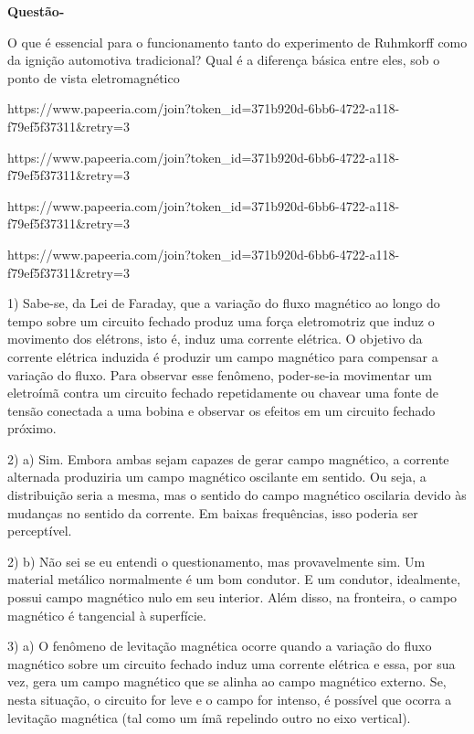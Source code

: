 \documentclass[12pt, a4paper, notitlepage]{article}
\newcounter{counterquestions}
\newenvironment{questions}{
    \noindent
    \stepcounter{counterquestions}
    \textbf{Questão\:\thecounterquestions\:-}
    \noindent
}{
    \noindent
}
\begin{document}
        \begin{questions}
            O que é essencial para o funcionamento tanto do experimento de Ruhmkorff como da ignição automotiva tradicional? Qual é a diferença básica entre eles, sob o ponto de vista eletromagnético
        \end{questions}
        \newpage
        
        https://www.papeeria.com/join?token_id=371b920d-6bb6-4722-a118-f79ef5f37311&retry=3
        
        https://www.papeeria.com/join?token_id=371b920d-6bb6-4722-a118-f79ef5f37311&retry=3
        
        https://www.papeeria.com/join?token_id=371b920d-6bb6-4722-a118-f79ef5f37311&retry=3
        
        https://www.papeeria.com/join?token_id=371b920d-6bb6-4722-a118-f79ef5f37311&retry=3
        
                1) Sabe-se, da Lei de Faraday, que a variação do fluxo magnético ao longo do tempo sobre um circuito fechado produz uma força eletromotriz que induz o movimento dos elétrons, isto é, induz uma corrente elétrica. O objetivo da corrente elétrica induzida é produzir um campo magnético para compensar a variação do fluxo. Para observar esse fenômeno, poder-se-ia movimentar um eletroímã contra um circuito fechado repetidamente ou chavear uma fonte de tensão conectada a uma bobina e observar os efeitos em um circuito fechado próximo.
        
        2) a) Sim. Embora ambas sejam capazes de gerar campo magnético, a corrente alternada produziria um campo magnético oscilante em sentido. Ou seja, a distribuição seria a mesma, mas o sentido do campo magnético oscilaria devido às mudanças no sentido da corrente. Em baixas frequências, isso poderia ser perceptível.
        
        2) b) Não sei se eu entendi o questionamento, mas provavelmente sim. Um material metálico normalmente é um bom condutor. E um condutor, idealmente, possui campo magnético nulo em seu interior. Além disso, na fronteira, o campo magnético é tangencial à superfície.
        
        3) a) O fenômeno de levitação magnética ocorre quando a variação do fluxo magnético sobre um circuito fechado induz uma corrente elétrica e essa, por sua vez, gera um campo magnético que se alinha ao campo magnético externo. Se, nesta situação, o circuito for leve e o campo for intenso, é possível que ocorra a levitação magnética (tal como um ímã repelindo outro no eixo vertical).
        
\end{document}

